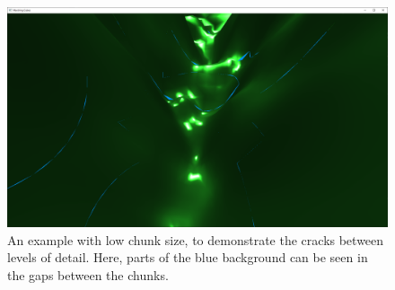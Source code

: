 \documentclass{article}
\begin{document}
\begin{figure}[H]
  \includegraphics[width=\textwidth]{cracks2.png}
  \caption{An example with low chunk size, to demonstrate the cracks between levels of detail. Here, parts of the blue background can be seen in the gaps between the chunks.}
  \label{fig:cracks2}
\end{figure}
\end{document}
